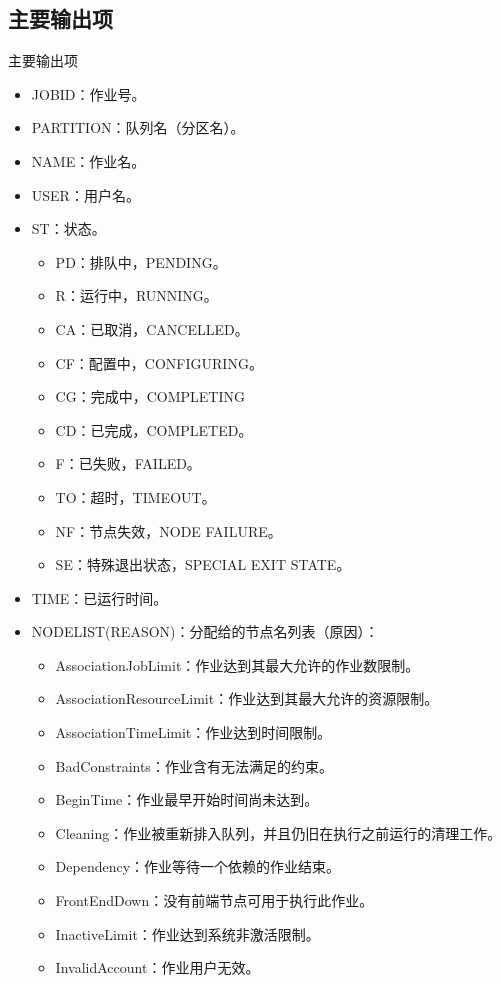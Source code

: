 \subsection{主要输出项}
\begin{frame}{主要输出项}
\begin{itemize}
	\item JOBID：作业号。
	\item PARTITION：队列名（分区名）。
	\item NAME：作业名。
	\item USER：用户名。
	\item ST：状态。
\begin{itemize}
	\item PD：排队中，PENDING。
	\item R：运行中，RUNNING。
	\item CA：已取消，CANCELLED。
	\item CF：配置中，CONFIGURING。
	\item CG：完成中，COMPLETING
	\item CD：已完成，COMPLETED。
	\item F：已失败，FAILED。
	\item TO：超时，TIMEOUT。
	\item NF：节点失效，NODE FAILURE。
	\item SE：特殊退出状态，SPECIAL EXIT STATE。
\end{itemize}
	\item TIME：已运行时间。
	\item NODELIST(REASON)：分配给的节点名列表（原因）：
\begin{itemize}
	\item AssociationJobLimit：作业达到其最大允许的作业数限制。
    \item AssociationResourceLimit：作业达到其最大允许的资源限制。
    \item AssociationTimeLimit：作业达到时间限制。
    \item BadConstraints：作业含有无法满足的约束。
    \item BeginTime：作业最早开始时间尚未达到。
    \item Cleaning：作业被重新排入队列，并且仍旧在执行之前运行的清理工作。
    \item Dependency：作业等待一个依赖的作业结束。
    \item FrontEndDown：没有前端节点可用于执行此作业。
    \item InactiveLimit：作业达到系统非激活限制。
    \item InvalidAccount：作业用户无效。

\end{itemize}
\end{itemize}
\end{frame}
